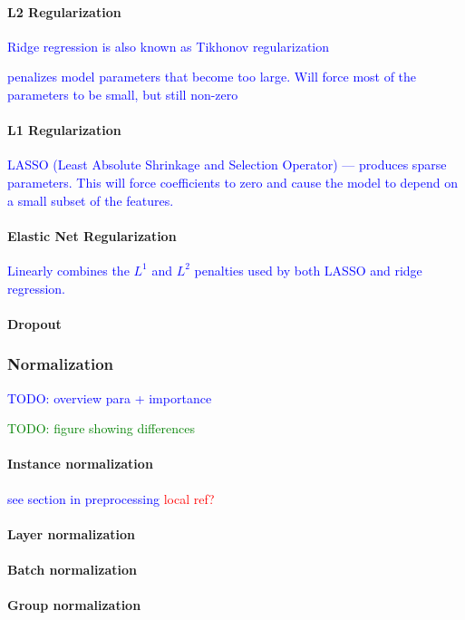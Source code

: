 \paragraph{L2 Regularization}

\textcolor{blue}{Ridge regression is also known as {Tikhonov regularization}}

\textcolor{blue}{penalizes model parameters that become too large. Will force most of the parameters to be small, but still non-zero}


\paragraph{L1 Regularization}

\textcolor{blue}{LASSO (Least Absolute Shrinkage and Selection Operator) --- produces sparse parameters. This will force coefficients to zero and cause the model to depend on a small subset of the features.}


\paragraph{Elastic Net Regularization}

\textcolor{blue}{Linearly combines the $L^1$ and $L^2$ penalties used by both LASSO and ridge regression.}


\paragraph{Dropout}




\subsubsection{Normalization}

\textcolor{blue}{TODO: overview para + importance}

\textcolor{green}{TODO: figure showing differences}

\paragraph{Instance normalization}

\textcolor{blue}{see section in preprocessing \textcolor{red}{local ref?}}

\paragraph{Layer normalization}

\paragraph{Batch normalization}

\paragraph{Group normalization}